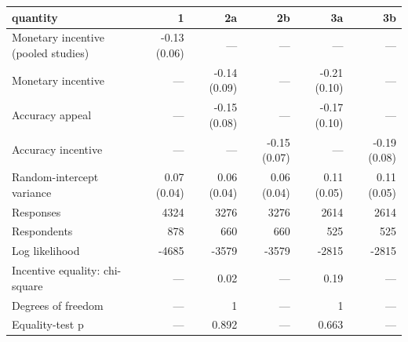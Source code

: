 \begin{tabular}{lrrrrr}
\toprule
quantity & 1 & 2a & 2b & 3a & 3b \\
\midrule
Monetary incentive (pooled studies) & -0.13 (0.06) & — & — & — & — \\
Monetary incentive & — & -0.14 (0.09) & — & -0.21 (0.10) & — \\
Accuracy appeal & — & -0.15 (0.08) & — & -0.17 (0.10) & — \\
Accuracy incentive & — & — & -0.15 (0.07) & — & -0.19 (0.08) \\
Random-intercept variance & 0.07 (0.04) & 0.06 (0.04) & 0.06 (0.04) & 0.11 (0.05) & 0.11 (0.05) \\
Responses & 4324 & 3276 & 3276 & 2614 & 2614 \\
Respondents & 878 & 660 & 660 & 525 & 525 \\
Log likelihood & -4685 & -3579 & -3579 & -2815 & -2815 \\
Incentive equality: chi-square & — & 0.02 & — & 0.19 & — \\
Degrees of freedom & — & 1 & — & 1 & — \\
Equality-test p & — & 0.892 & — & 0.663 & — \\
\bottomrule
\end{tabular}
